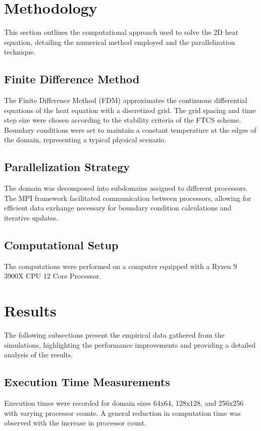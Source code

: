 \documentclass[11pt]{article}
\begin{document}
    \section{Methodology}
        This section outlines the computational approach used to solve the 2D heat equation, detailing the numerical method employed and the parallelization technique.

        \subsection{Finite Difference Method}
        The Finite Difference Method (FDM) approximates the continuous differential equations of the heat equation with a discretized grid. The grid spacing and time step size were chosen according to the stability criteria of the FTCS scheme. Boundary conditions were set to maintain a constant temperature at the edges of the domain, representing a typical physical scenario.

        \subsection{Parallelization Strategy}
        The domain was decomposed into subdomains assigned to different processors. The MPI framework facilitated communication between processors, allowing for efficient data exchange necessary for boundary condition calculations and iterative updates.

        \subsection{Computational Setup}
        The computations were performed on a computer equipped with a Ryzen 9 3900X CPU 12 Core Processor.

    \section{Results}
        The following subsections present the empirical data gathered from the simulations, highlighting the performance improvements and providing a detailed analysis of the results.

        \subsection{Execution Time Measurements}
        Execution times were recorded for domain sizes 64x64, 128x128, and 256x256 with varying processor counts. A general reduction in computation time was observed with the increase in processor count.
\end{document}

